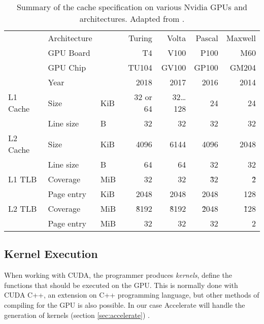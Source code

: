\begin{table}
    \centering
    \begin{tabular}{l l l|r r r r}
        & Architecture & &    Turing &      Volta & Pascal & Maxwell
        \\
        & GPU Board    & &        T4 &       V100 &   P100 &     M60
        \\
        & GPU Chip     & &     TU104 &      GV100 &  GP100 &   GM204
        \\
        & Year         & &      2018 &       2017 &   2016 &    2014
        \\
        \hline
        L1 Cache%
        & Size     & KiB &  32 or 64 & 32\dots128 &     24 &      24
        \\
        & Line size  & B &        32 &         32 &     32 &      32
        \\
        \hline
        L2 Cache%
        & Size     & KiB &      4096 &      6144 &   4096 &    2048
        \\
        & Line size  & B &        64 &        64 &     32 &      32
        \\
        \hline
        L1 TLB%
        & Coverage   & MiB &      32 &        32 &   \~32 &     \~2
        \\
        & Page entry & KiB &    2048 &    2048   &   2048 &     128
        \\
        \hline
        L2 TLB%
        & Coverage   & MiB &  \~8192 &  \~8192   & \~2048 &   \~128
        \\
        & Page entry & MiB &      32 &      32   &     32 &       2
    \end{tabular}
    \caption{
        Summary of the cache specification on various Nvidia GPUs and architectures. 
        Adapted from \citeauthor{jia2019dissecting}\cite{jia2019dissecting}.
    }
\end{table}

\subsection{Kernel Execution}
\label{sec:kernel_execution}
When working with CUDA, the programmer produces \textit{kernels}, define the functions that should be executed on the GPU.
This is normally done with CUDA C++, an extension on C++ programming language, but other methods of compiling for the GPU is also possible. 
In our case Accelerate will handle the generation of kernels (section \ref{sec:accelerate}) \cite{nvidia2021cudadocs}.


